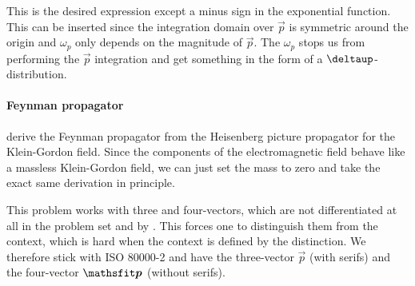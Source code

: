 \documentclass[11pt, english, fleqn, DIV=15, headinclude, BCOR=1cm]{scrartcl}
\begin{document}
This is the desired expression except a minus sign in the exponential function.
This can be inserted since the integration domain over $\vec p$ is symmetric
around the origin and $\omega_p$ only depends on the magnitude of $\vec p$. The
$\omega_p$ stops us from performing the $\vec p$ integration and get something
in the form of a $\deltaup$-distribution.

\paragraph{Feynman propagator}

\textcite[pp. 27 -- 31]{Peskin/QFT/1995} derive the Feynman propagator from the
Heisenberg picture propagator for the Klein-Gordon field. Since the components
of the electromagnetic field behave like a massless Klein-Gordon field, we can
just set the mass to zero and take the exact same derivation in principle.

This problem works with three and four-vectors, which are not differentiated at
all in the problem set and by \textcite{Peskin/QFT/1995}. This forces one to
distinguish them from the context, which is hard when the context is defined by
the distinction. We therefore stick with ISO 80000-2 and have the three-vector
$\vec p$ (with serifs) and the four-vector $\tens p$ (without serifs).
\end{document}
